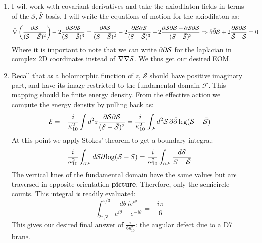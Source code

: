 \documentclass[11pt, class=article, crop=false]{standalone}
\begin{document}
\begin{enumerate}
	\item I will work with covariant derivatives and take the axiodilaton fields in terms of the $\mathcal S, \bar{\mathcal S}$ basis. I will write the equations of motion for the axiodilaton as:
	\[
		\bar \nabla \left(\frac{\d \S}{(\S- \bar \S)^2} \right) - 2 \frac{\d \S \bar \d \bar {\S}}{(S - \bar{\S})^3} = \frac{\d \bar \d \mathcal S}{(S-\bar S)^2} - 2 \frac{\d \S \bar \d \bar {\S}}{(S - \bar{\S})^3} + 2 \frac{\d \S \bar \d \bar {\S} - \d \S \bar \d \S}{(S - \bar{\S})^3} \Rightarrow \d \bar \d \S + 2 \frac{\d \S \bar \d \S}{\bar \S - \S} = 0
	\]
	Where it is important to note that we can write $\d \bar \d \S$ for the laplacian in complex 2D coordinates instead of $\nabla \nabla \S$. We thus get our desired EOM. 
	
	\item Recall that as a holomorphic function of $z$, $\mathcal S$ should have positive imaginary part, and have its image restricted to the fundamental domain $\mathcal F$. This mapping should be finite energy density. From the effective action we compute the energy density by pulling back as:
	\[
		\mathcal E = -\frac{i}{\kappa_{10}^2} \int d^2 z \frac{\d \mathcal S \bar \d \bar {\mathcal S}}{(\mathcal S - \bar {\mathcal S})^2} = \frac{i}{\kappa_{10}^2} \int_{\mathcal F} d^2 {\mathcal S} \, \d \bar \d \log(\mathcal S - \bar {\mathcal S})
	\]
	At this point we apply Stokes' theorem to get a boundary integral:
	\[
		\frac{i}{\kappa_{10}^2} \int_{\d \mathcal F} d \mathcal S \d \log(\mathcal S - \bar{\mathcal S}) = \frac{i}{\kappa_{10}^2} \int_{\d \mathcal F} \frac{d \mathcal S}{S - \bar{\mathcal S}}
	\]
	The vertical lines of the fundamental domain have the same values but are traversed in opposite orientation \textbf{picture}. Therefore, only the semicircle counts. This integral is readily evaluated:
	\[
		\int_{2 \pi /3}^{\pi/3} \frac{d \theta\, i e^{i \theta}}{e^{i \theta} - e^{-i \theta}} = -\frac{i \pi}{6}
	\]
	This gives our desired final answer of $\frac{\pi}{6 \kappa_{10}^2}$: the angular defect due to a D7 brane.
	
\end{enumerate}

\end{document}

